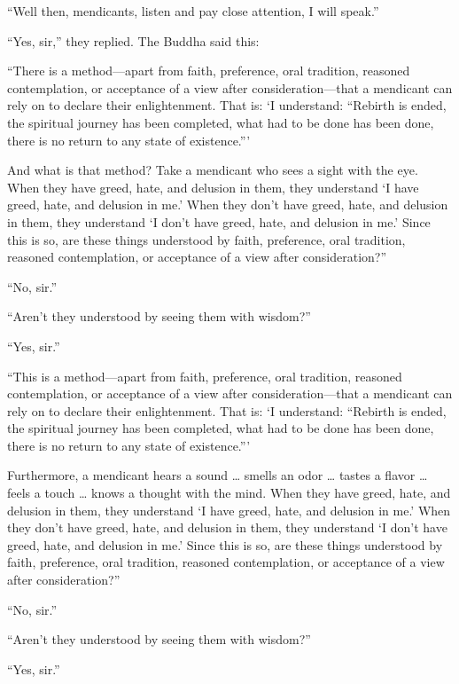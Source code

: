 \documentclass[12pt,openany]{book}%
\begin{document}
“Well then, mendicants, listen and pay close attention, I will speak.” 

“Yes, sir,” they replied. The Buddha said this: 

“There is a method—apart from faith, preference, oral tradition, reasoned contemplation, or acceptance of a view after consideration—that a mendicant can rely on to declare their enlightenment. That is: ‘I understand: “Rebirth is ended, the spiritual journey has been completed, what had to be done has been done, there is no return to any state of existence.”’ 

And what is that method? Take a mendicant who sees a sight with the eye. When they have greed, hate, and delusion in them, they understand ‘I have greed, hate, and delusion in me.’ When they don’t have greed, hate, and delusion in them, they understand ‘I don’t have greed, hate, and delusion in me.’ Since this is so, are these things understood by faith, preference, oral tradition, reasoned contemplation, or acceptance of a view after consideration?” 

“No, sir.” 

“Aren’t they understood by seeing them with wisdom?” 

“Yes, sir.” 

“This is a method—apart from faith, preference, oral tradition, reasoned contemplation, or acceptance of a view after consideration—that a mendicant can rely on to declare their enlightenment. That is: ‘I understand: “Rebirth is ended, the spiritual journey has been completed, what had to be done has been done, there is no return to any state of existence.”’ 

Furthermore, a mendicant hears a sound … smells an odor … tastes a flavor … feels a touch … knows a thought with the mind. When they have greed, hate, and delusion in them, they understand ‘I have greed, hate, and delusion in me.’ When they don’t have greed, hate, and delusion in them, they understand ‘I don’t have greed, hate, and delusion in me.’ Since this is so, are these things understood by faith, preference, oral tradition, reasoned contemplation, or acceptance of a view after consideration?” 

“No, sir.” 

“Aren’t they understood by seeing them with wisdom?” 

“Yes, sir.” 
\end{document}

